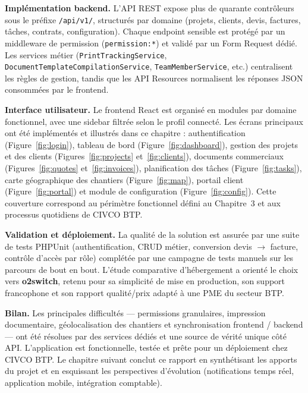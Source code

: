 \medskip

\textbf{Implémentation backend.} L'API REST expose plus de quarante contrôleurs
sous le préfixe \texttt{/api/v1/}, structurés par domaine (projets, clients,
devis, factures, tâches, contrats, configuration). Chaque endpoint sensible est
protégé par un middleware de permission (\texttt{permission:*}) et validé par
un Form Request dédié. Les services métier (\texttt{PrintTrackingService},
\texttt{DocumentTemplateCompilationService}, \texttt{TeamMemberService}, etc.)
centralisent les règles de gestion, tandis que les API Resources normalisent
les réponses JSON consommées par le frontend.

\medskip

\textbf{Interface utilisateur.} Le frontend React est organisé en modules par
domaine fonctionnel, avec une sidebar filtrée selon le profil connecté. Les
écrans principaux ont été implémentés et illustrés dans ce chapitre :
authentification (Figure~\ref{fig:login}), tableau de bord
(Figure~\ref{fig:dashboard}), gestion des projets et des clients
(Figures~\ref{fig:projects} et~\ref{fig:clients}), documents commerciaux
(Figures~\ref{fig:quotes} et~\ref{fig:invoices}), planification des tâches
(Figure~\ref{fig:tasks}), carte géographique des chantiers (Figure~\ref{fig:map}),
portail client (Figure~\ref{fig:portal}) et module de configuration
(Figure~\ref{fig:config}). Cette couverture correspond au périmètre fonctionnel
défini au Chapitre~3 et aux processus quotidiens de CIVCO BTP.

\medskip

\textbf{Validation et déploiement.} La qualité de la solution est assurée par
une suite de tests PHPUnit (authentification, CRUD métier, conversion
devis $\rightarrow$ facture, contrôle d'accès par rôle) complétée par une
campagne de tests manuels sur les parcours de bout en bout. L'étude comparative
d'hébergement a orienté le choix vers \textbf{o2switch}, retenu pour sa simplicité
de mise en production, son support francophone et son rapport qualité/prix adapté
à une PME du secteur BTP.

\medskip

\textbf{Bilan.} Les principales difficultés --- permissions granulaires,
impression documentaire, géolocalisation des chantiers et synchronisation
frontend / backend --- ont été résolues par des services dédiés et une
source de vérité unique côté API. L'application est fonctionnelle, testée et
prête pour un déploiement chez CIVCO BTP. Le chapitre suivant conclut ce rapport
en synthétisant les apports du projet et en esquissant les perspectives
d'évolution (notifications temps réel, application mobile, intégration comptable).

\newpage
